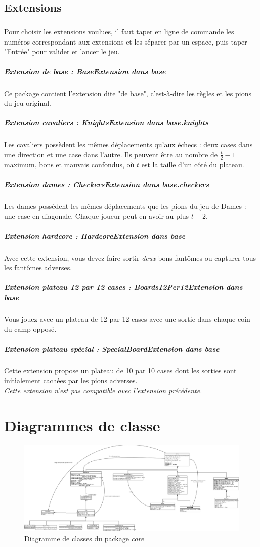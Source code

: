 \documentclass[]{report}
\begin{document}
\subsection{Extensions}
\subparagraph*{}
Pour choisir les extensions voulues, il faut taper en ligne de commande les numéros correspondant aux extensions et les séparer par un espace, puis taper "Entrée" pour valider et lancer le jeu.
\subparagraph{Extension de base : \textit{BaseExtension} dans \textit{base}}
Ce package contient l'extension dite "de base", c'est-à-dire les règles et les pions du jeu original.

\subparagraph{Extension cavaliers : \textit{KnightsExtension} dans \textit{base.knights}}
Les cavaliers possèdent les mêmes déplacements qu'aux échecs : deux cases dans une direction et une case dans l'autre. Ils peuvent être au nombre de $\frac{t}{2}-1$ maximum, bons et mauvais confondus, où $t$ est la taille d'un côté du plateau.

\subparagraph{Extension dames : \textit{CheckersExtension} dans \textit{base.checkers}}
Les dames possèdent les mêmes déplacements que les pions du jeu de Dames : une case en diagonale. Chaque joueur peut en avoir au plus $t - 2$.

\subparagraph{Extension hardcore : \textit{HardcoreExtension} dans \textit{base}}
Avec cette extension, vous devez faire sortir \emph{deux} bons fantômes ou capturer tous les fantômes adverses.

\subparagraph{Extension plateau 12 par 12 cases : \textit{Boards12Per12Extension} dans \textit{base}}
Vous jouez avec un plateau de 12 par 12 cases avec une sortie dans chaque coin du camp opposé.

\subparagraph{Extension plateau spécial : \textit{SpecialBoardExtension} dans \textit{base}}
Cette extension propose un plateau de 10 par 10 cases dont les sorties sont initialement cachées par les pions adverses.\\
\emph{Cette extension n'est pas compatible avec l'extension précédente.}

\section{Diagrammes de classe}

\begin{figure}[!h]
	\caption{Diagramme de classes du package \textit{core}}
	\includegraphics[width=\textwidth]{core.png}
\end{figure}
\end{document}
